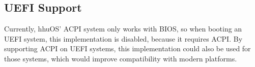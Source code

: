 \subsection{UEFI Support}
\label{subsec:uefisupport}

Currently, hhuOS' ACPI system only works with BIOS, so when booting an UEFI system, this implementation is disabled, because it requires ACPI\@.
By supporting ACPI on UEFI systems, this implementation could also be used for those systems, which would improve compatibility with modern platforms.

\cleardoublepage